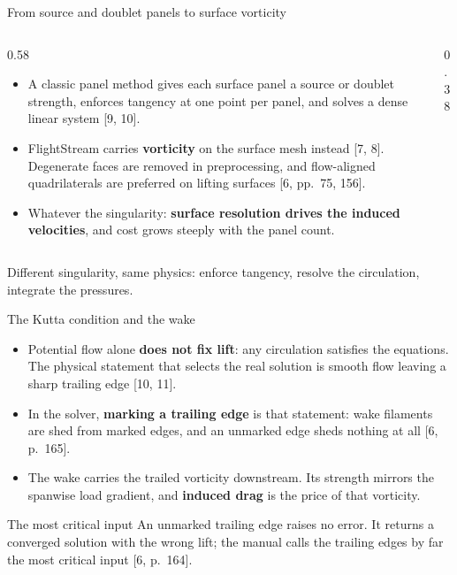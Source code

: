 \begin{frame}{From source and doublet panels to surface vorticity}
\begin{columns}[T]
\begin{column}{0.58\textwidth}
\begin{itemize}\small
  \item A classic panel method gives each surface panel a source or doublet
        strength, enforces tangency at one point per panel, and solves a
        dense linear system [9, 10].
  \item FlightStream carries \textbf{vorticity} on the surface mesh instead
        [7, 8]. Degenerate faces are removed in preprocessing, and
        flow-aligned quadrilaterals are preferred on lifting surfaces
        [6, pp.~75, 156].
  \item Whatever the singularity: \textbf{surface resolution drives the
        induced velocities}, and cost grows steeply with the panel count.
\end{itemize}
\end{column}
\begin{column}{0.38\textwidth}
\end{column}
\end{columns}
\begin{takeaway}Different singularity, same physics: enforce tangency, resolve
the circulation, integrate the pressures.\end{takeaway}
\end{frame}

\begin{frame}{The Kutta condition and the wake}
\begin{itemize}\small
  \item Potential flow alone \textbf{does not fix lift}: any circulation
        satisfies the equations. The physical statement that selects the real
        solution is smooth flow leaving a sharp trailing edge [10, 11].
  \item In the solver, \textbf{marking a trailing edge} is that statement:
        wake filaments are shed from marked edges, and an unmarked edge sheds
        nothing at all [6, p.~165].
  \item The wake carries the trailed vorticity downstream. Its strength
        mirrors the spanwise load gradient, and \textbf{induced drag} is the
        price of that vorticity.
\end{itemize}
\begin{alertblock}{The most critical input}
\small An unmarked trailing edge raises no error. It returns a converged
solution with the wrong lift; the manual calls the trailing edges by far the
most critical input [6, p.~164].
\end{alertblock}
\end{frame}

